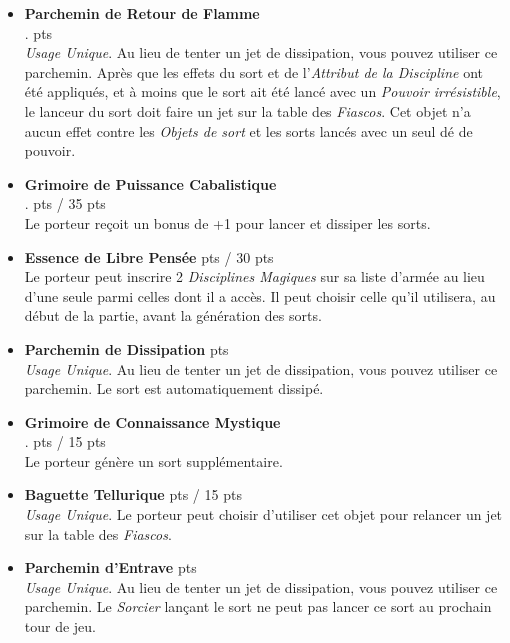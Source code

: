 \begin{multicols}{2}
\begin{itemize}[label={-}]
\item \textbf{Parchemin de Retour de Flamme} \\ . {pts} \\
\emph{Usage Unique}. Au lieu de tenter un jet de dissipation, vous pouvez utiliser ce parchemin. Après que les effets du sort et de l'\emph{Attribut de la Discipline} ont été appliqués, et à moins que le sort ait été lancé avec un \emph{Pouvoir irrésistible}, le lanceur du sort doit faire un jet sur la table des \emph{Fiascos}. Cet objet n'a aucun effet contre les \emph{Objets de sort} et les sorts lancés avec un seul dé de pouvoir.

\item \textbf{Grimoire de Puissance Cabalistique} \\ . {pts} / 35 {pts} \\
Le porteur reçoit un bonus de +1 pour lancer et dissiper les sorts.

\item \textbf{Essence de Libre Pensée}  {pts} / 30 {pts} \\
Le porteur peut inscrire 2 \emph{Disciplines Magiques} sur sa liste d'armée au lieu d'une seule parmi celles dont il a accès. Il peut choisir celle qu'il utilisera, au début de la partie, avant la génération des sorts.

\item \textbf{Parchemin de Dissipation}  {pts} \\
\emph{Usage Unique}. Au lieu de tenter un jet de dissipation, vous pouvez utiliser ce parchemin. Le sort est automatiquement dissipé.

\item \textbf{Grimoire de Connaissance Mystique} \\ . {pts} / 15 {pts} \\
Le porteur génère un sort supplémentaire.

\item \textbf{Baguette Tellurique}  {pts} / 15 {pts} \\
\emph{Usage Unique}. Le porteur peut choisir d'utiliser cet objet pour relancer un jet sur la table des \emph{Fiascos}.

\item \textbf{Parchemin d'Entrave}  {pts} \\
\emph{Usage Unique}. Au lieu de tenter un jet de dissipation, vous pouvez utiliser ce parchemin. Le \emph{Sorcier} lançant le sort ne peut pas lancer ce sort au prochain tour de jeu.


\end{itemize}
\end{multicols}

